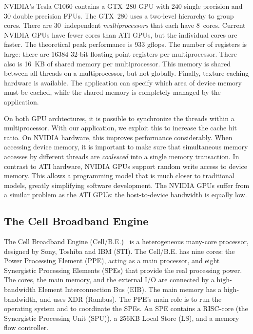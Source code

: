 \documentclass{article}
\begin{document}
NVIDIA's Tesla C1060 contains a GTX~280 GPU with 240 single precision
and 30 double precision FPUs. The GTX~280 uses a two-level hierarchy to group cores.
There are 30~independent \emph{multiprocessors\/} that each have 8~cores.
Current NVIDIA GPUs have fewer
cores than ATI GPUs, but the individual cores are faster.
The theoretical peak performance is 933 gflops.
The number of registers is large: there are 16384 32-bit floating
point registers per multiprocessor. There also is 16~KB of shared
memory per multiprocessor.  This memory is shared between all threads
on a multiprocessor, but not globally.  Finally, texture caching
hardware is available.  The application can specify which area of
device memory must be cached, while the shared memory is completely
managed by the application.

On both GPU archtectures, it is possible to synchronize the threads within a
multiprocessor.  With our application, we exploit this to increase the
cache hit ratio. On NVIDIA hardware, this improves performance considerably.  When
accessing device memory, it is important to make sure that
simultaneous memory accesses by different threads are \emph{coalesced}
into a single memory transaction.  In contrast to ATI hardware, NVIDIA
GPUs support random write access to device memory. This allows a
programming model that is much closer to traditional models, greatly
simplifying software development.  The NVIDIA GPUs suffer from a
similar problem as the ATI GPUs: the host-to-device bandwidth is
equally low.



\subsection{The Cell Broadband Engine}

The Cell Broadband Engine (\mbox{Cell/B.E.})~\cite{cell} is a
heterogeneous many-core processor, designed by Sony, Toshiba and IBM
(STI).  The \mbox{Cell/B.E.} has nine cores: the Power Processing
Element (PPE), acting as a main processor, and eight Synergistic
Processing Elements (SPEs) that provide the real processing power.
The cores, the main memory, and the external I/O are connected by a
high-bandwidth Element Interconnection Bus (EIB).  The main memory has
a high-bandwidth, and uses XDR (Rambus).  The PPE's main role is to
run the operating system and to coordinate the SPEs.  An SPE contains
a RISC-core (the Synergistic Processing Unit (SPU)), a 256KB Local
Store (LS), and a memory flow controller.
\end{document}
